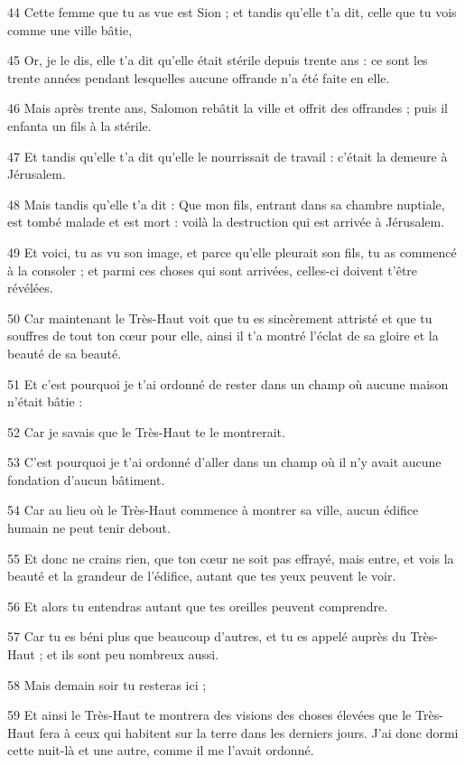 \par 44 Cette femme que tu as vue est Sion ; et tandis qu'elle t'a dit, celle que tu vois comme une ville bâtie,
\par 45 Or, je le dis, elle t'a dit qu'elle était stérile depuis trente ans : ce sont les trente années pendant lesquelles aucune offrande n'a été faite en elle.
\par 46 Mais après trente ans, Salomon rebâtit la ville et offrit des offrandes ; puis il enfanta un fils à la stérile.
\par 47 Et tandis qu'elle t'a dit qu'elle le nourrissait de travail : c'était la demeure à Jérusalem.
\par 48 Mais tandis qu'elle t'a dit : Que mon fils, entrant dans sa chambre nuptiale, est tombé malade et est mort : voilà la destruction qui est arrivée à Jérusalem.
\par 49 Et voici, tu as vu son image, et parce qu'elle pleurait son fils, tu as commencé à la consoler ; et parmi ces choses qui sont arrivées, celles-ci doivent t'être révélées.
\par 50 Car maintenant le Très-Haut voit que tu es sincèrement attristé et que tu souffres de tout ton cœur pour elle, ainsi il t'a montré l'éclat de sa gloire et la beauté de sa beauté.
\par 51 Et c'est pourquoi je t'ai ordonné de rester dans un champ où aucune maison n'était bâtie :
\par 52 Car je savais que le Très-Haut te le montrerait.
\par 53 C'est pourquoi je t'ai ordonné d'aller dans un champ où il n'y avait aucune fondation d'aucun bâtiment.
\par 54 Car au lieu où le Très-Haut commence à montrer sa ville, aucun édifice humain ne peut tenir debout.
\par 55 Et donc ne crains rien, que ton cœur ne soit pas effrayé, mais entre, et vois la beauté et la grandeur de l'édifice, autant que tes yeux peuvent le voir.
\par 56 Et alors tu entendras autant que tes oreilles peuvent comprendre.
\par 57 Car tu es béni plus que beaucoup d'autres, et tu es appelé auprès du Très-Haut ; et ils sont peu nombreux aussi.
\par 58 Mais demain soir tu resteras ici ;
\par 59 Et ainsi le Très-Haut te montrera des visions des choses élevées que le Très-Haut fera à ceux qui habitent sur la terre dans les derniers jours. J'ai donc dormi cette nuit-là et une autre, comme il me l'avait ordonné.

